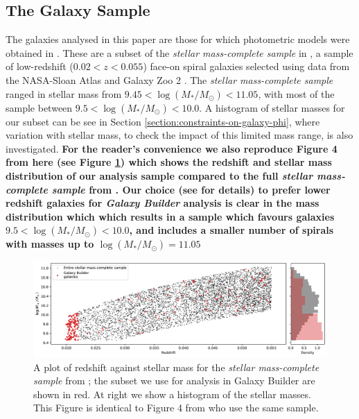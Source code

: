 \subsection{The Galaxy Sample}
The galaxies analysed in this paper are those for which photometric models were obtained in \citet{2020arXiv200610450L}. These are a subset of the \textit{stellar mass-complete sample} in \citet{2017MNRAS.472.2263H}, a sample of low-redshift ($0.02 < z < 0.055$) face-on spiral galaxies selected using data from the NASA-Sloan Atlas \citep{2011AJ....142...31B} and Galaxy Zoo 2 \citep{Willett2013:1308.3496v2}. The \textit{stellar mass-complete sample} ranged in stellar mass from $9.45 < \log(M_* / M_\odot) < 11.05$, with most of the sample between $9.5 < \log(M_* / M_\odot) < 10.0$. A histogram of stellar masses for our subset can be see in Section \ref{section:constraints-on-galaxy-phi}, where variation with stellar mass, to check the impact of this limited mass range, is also investigated. {\bf For the reader's convenience we also reproduce Figure 4 from \citet{2020arXiv200610450L} here (see Figure \ref{fig:stellarmass}) which shows the redshift and stellar mass distribution of our analysis sample compared to the full \textit{stellar mass-complete sample} from \citet{2017MNRAS.472.2263H}. Our choice (see \citet{2020arXiv200610450L} for details) to prefer lower redshift galaxies for {\it Galaxy Builder} analysis is clear in the mass distribution which which results in a sample which favours galaxies $9.5 < \log(M_* / M_\odot) < 10.0$, and includes a smaller number of spirals with masses up to  $\log(M_* / M_\odot) = 11.05$}

\begin{figure}
  \includegraphics[width=17.7cm]{plots/stellar_mass_selection_plot.pdf}
  \caption{A plot of redshift against stellar mass for the \textit{stellar mass-complete sample} from \citet{2017MNRAS.472.2263H}; the subset we use for analysis in Galaxy Builder are shown in red. At right we show a histogram of the stellar masses. This Figure is identical to Figure 4 from \citet{2020arXiv200610450L} who use the same sample.}
  \label{fig:stellarmass}
\end{figure}

